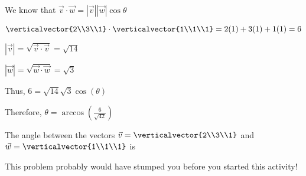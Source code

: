 \documentclass{ximera}
\begin{document}
\begin{question}
  \begin{solution}
    \begin{hint}
      We know that $\vec{v}\cdot\vec{w} =  |\vec{v}||\vec{w}|\cos{\theta}$
    \end{hint}
    \begin{hint}	
      $\verticalvector{2\\3\\1} \cdot \verticalvector{1\\1\\1} = 2(1)+3(1)+1(1) = 6$
    \end{hint}
    \begin{hint}
      $|\vec{v}| = \sqrt{\vec{v}\cdot\vec{v}} = \sqrt{14}$
    \end{hint}
    \begin{hint}
      $|\vec{w}| = \sqrt{\vec{w}\cdot\vec{w}} = \sqrt{3}$
    \end{hint}
    \begin{hint}
      Thus, $6 = \sqrt{14}\sqrt{3}\cos(\theta)$
    \end{hint}
    \begin{hint}
      Therefore, $\theta = \arccos(\frac{6}{\sqrt{42}})$
    \end{hint}
    The angle between the vectors $\vec{v} = \verticalvector{2\\3\\1}$  and $\vec{w}=\verticalvector{1\\1\\1}$ is 
  \end{solution}
  This problem probably would have stumped you before you started this activity!
\end{question}
\end{document}
